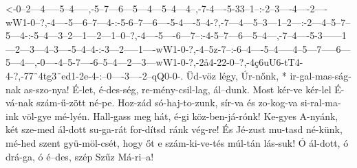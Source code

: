  {<-0--2---4-----5--4-----,-5--7---6---5---4---5--4---4--,-7-4----5-33--1--:-2--3----4----2----wW1-0--?,-4----5---6--7---4-:-5-6--7---6----5-4----5--4-?,-7---4---5--3---1--2---:-2---4--5--7--5---4-:-5--4---3--2---1---2---1--0--?,-4----5----6---7--:-4-5--7---6---5--4---,-7--4----5-3------1---2---3---4--3----5--4--4-:-3---2-----1----wW1-0-?,-4--5z-7--:-6--4----5--4-----4--5---7-----6---5---4---,-0----4--5-7----6--5--4---2---3---wW1-0-?,-2å4-22-0--?,-4ç6uU6-tT4-4-?,-77¨4tg3¨ed1-2e-4-:--0----3----2--qQ0-0-.}
  {  Üd-vöz légy, Úr-nőnk, * ir-gal-mas-ság-nak as-szo-nya! É-let, é-des-ség, re-mény-csil-lag, ál--dunk. Most kér-ve kér-lel É-vá-nak szám-ű-zött né-pe.  Hoz-zád só-haj-to-zunk, sír-va és zo-kog-va  si-ral-ma-ink völ-gye mé-lyén. Hall-gass meg hát, é-gi köz-ben-já-rónk! Ke-gyes A-nyánk, két sze-med ál-dott su-ga-rát for-dítsd ránk vég-re!  És Jé-zust mu-tasd né-künk, mé-hed szent gyü-möl-csét, hogy őt e szám-ki-ve-tés múl-tán lás-suk! Ó   ál-dott, ó      drá-ga,  ó           é--des, szép Szűz Má-ri--a!}

